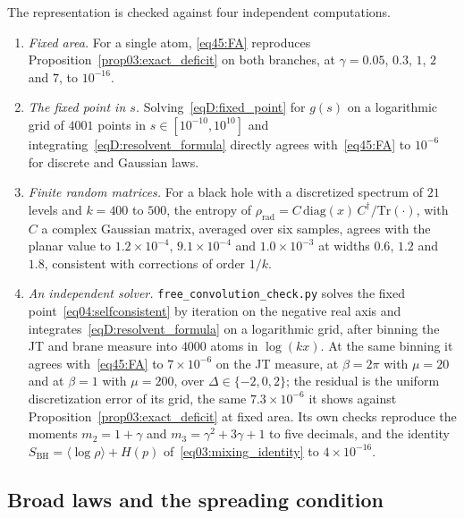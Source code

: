\documentclass[11pt,letterpaper]{article}
\theoremstyle{plain}
\theoremstyle{definition}
\theoremstyle{remark}
\begin{document}
The representation is checked against four independent computations.
\begin{enumerate}
\item \emph{Fixed area.} For a single atom, \eqref{eq45:FA} reproduces Proposition~\ref{prop03:exact_deficit} on both branches, at $\gamma = 0.05$, $0.3$, $1$, $2$ and $7$, to $10^{-16}$.
\item \emph{The fixed point in $s$.} Solving~\eqref{eqD:fixed_point} for $g(s)$ on a logarithmic grid of $4001$ points in $s \in [10^{-10}, 10^{10}]$ and integrating~\eqref{eqD:resolvent_formula} directly agrees with~\eqref{eq45:FA} to $10^{-6}$ for discrete and Gaussian laws.
\item \emph{Finite random matrices.} For a black hole with a discretized spectrum of $21$ levels and $k = 400$ to $500$, the entropy of $\rho_{\mathrm{rad}} = C\,\mathrm{diag}(x)\,C^\dagger/\mathrm{Tr}(\cdot)$, with $C$ a complex Gaussian matrix, averaged over six samples, agrees with the planar value to $1.2\times10^{-4}$, $9.1\times10^{-4}$ and $1.0\times10^{-3}$ at widths $0.6$, $1.2$ and $1.8$, consistent with corrections of order $1/k$.
\item \emph{An independent solver.} \texttt{free\_convolution\_check.py} solves the fixed point~\eqref{eq04:selfconsistent} by iteration on the negative real axis and integrates~\eqref{eqD:resolvent_formula} on a logarithmic grid, after binning the JT and brane measure into $4000$ atoms in $\log(kx)$. At the same binning it agrees with~\eqref{eq45:FA} to $7\times10^{-6}$ on the JT measure, at $\beta = 2\pi$ with $\mu = 20$ and at $\beta = 1$ with $\mu = 200$, over $\Delta \in \{-2, 0, 2\}$; the residual is the uniform discretization error of its grid, the same $7.3\times10^{-6}$ it shows against Proposition~\ref{prop03:exact_deficit} at fixed area. Its own checks reproduce the moments $m_2 = 1 + \gamma$ and $m_3 = \gamma^2 + 3\gamma + 1$ to five decimals, and the identity $S_{\mathrm{BH}} = \langle\log\rho\rangle + H(p)$ of~\eqref{eq03:mixing_identity} to $4\times10^{-16}$.
\end{enumerate}

\subsection{Broad laws and the spreading condition}
\label{subsecE:convergence}
\end{document}
